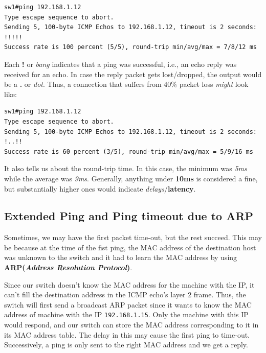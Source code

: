 \vspace{-15pt}
\begin{verbatim}
sw1#ping 192.168.1.12
Type escape sequence to abort.
Sending 5, 100-byte ICMP Echos to 192.168.1.12, timeout is 2 seconds:
!!!!!
Success rate is 100 percent (5/5), round-trip min/avg/max = 7/8/12 ms
\end{verbatim}
\vspace{-10pt}

\noindent
Each \textbf{!} or \textit{bang} indicates that a ping was successful, i.e., an echo reply was received for an echo. In case the reply packet gets lost/dropped, the output would be a \textbf{.} or \textit{dot}. Thus, a connection that suffers from 40\% packet loss \textit{might} look like: 

\vspace{-15pt}
\begin{verbatim}
sw1#ping 192.168.1.12
Type escape sequence to abort.
Sending 5, 100-byte ICMP Echos to 192.168.1.12, timeout is 2 seconds:
!..!!
Success rate is 60 percent (3/5), round-trip min/avg/max = 5/9/16 ms
\end{verbatim}
\vspace{-10pt}

\noindent
It also tells us about the round-trip time. In this case, the minimum was \textit{5ms} while the average was \textit{9ms}. Generally, anything under \textbf{10ms} is considered a fine, but substantially higher ones would indicate \textit{delays}/\textbf{latency}. 

\subsection{Extended Ping and Ping timeout due to ARP}
\vspace{-10pt}
Sometimes, we may have the first packet time-out, but the rest succeed. This may be because at the time of the fist ping, the MAC address of the destination host was unknown to the switch and it had to learn the MAC address by using \textbf{ARP(\textit{Address Resolution Protocol})}. 

Since our switch doesn't know the MAC address for the machine with the IP, it can't fill the destination address in the ICMP echo's layer 2 frame. Thus, the switch will first send a broadcast ARP packet since it wants to know the MAC address of machine with the IP \verb|192.168.1.15|. Only the machine with this IP would respond, and our switch can store the MAC address corresponding to it in its MAC address table. The delay in this may cause the first ping to time-out. Successively, a ping is only sent to the right MAC address and we get a reply. 

